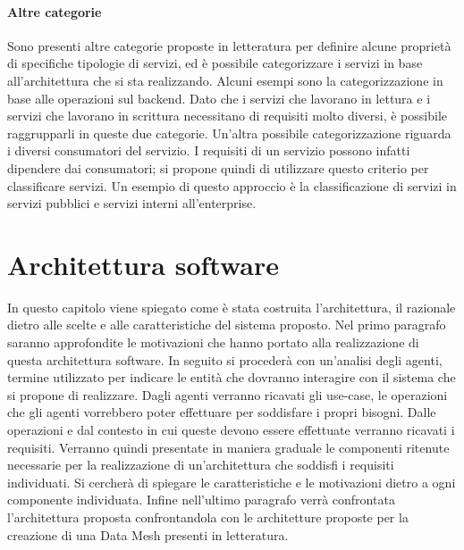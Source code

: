 \documentclass[a4paper,12pt]{report}
\begin{document}
\subsubsection{Altre categorie}
Sono presenti altre categorie proposte in letteratura per definire alcune proprietà di specifiche tipologie di servizi, ed è possibile categorizzare i servizi in base all'architettura che si sta realizzando. 
Alcuni esempi sono la categorizzazione in base alle operazioni sul backend. 
Dato che i servizi che lavorano in lettura e i servizi che lavorano in scrittura necessitano di requisiti molto diversi, è possibile raggrupparli in queste due categorie.
Un'altra possibile categorizzazione riguarda i diversi consumatori del servizio. 
I requisiti di un servizio possono infatti dipendere dai consumatori; si propone quindi di utilizzare questo criterio per classificare servizi. 
Un esempio di questo approccio è la classificazione di servizi in servizi pubblici e  servizi interni all'enterprise.

\chapter{Architettura software}\label{architetturaLogica}
In questo capitolo viene spiegato come è stata costruita l'architettura, il razionale dietro alle scelte e alle caratteristiche del sistema proposto. 
Nel primo paragrafo saranno approfondite le motivazioni che hanno portato alla realizzazione di questa architettura software.
In seguito si procederà con un'analisi degli agenti, termine utilizzato per indicare le entità che dovranno interagire con il sistema che si propone di realizzare.
Dagli agenti verranno ricavati gli use-case, le operazioni che gli agenti vorrebbero poter effettuare per soddisfare i propri bisogni.
Dalle operazioni e dal contesto in cui queste devono essere effettuate verranno ricavati i requisiti.
Verranno quindi presentate in maniera graduale le componenti ritenute necessarie per la realizzazione di un'architettura che soddisfi i requisiti individuati. 
Si cercherà di spiegare le caratteristiche e le motivazioni dietro a ogni componente individuata.
Infine nell'ultimo paragrafo verrà confrontata l'architettura proposta confrontandola con le architetture proposte per la creazione di una Data Mesh presenti in letteratura.
\end{document}
